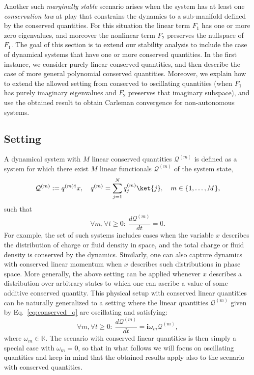 \documentclass[superscriptaddress,onecolumn,nofootinbib,longbibliography,a4paper,accepted=2026-09-29]{quantumarticle}
\theoremstyle{plain}
\theoremstyle{definition}
\numberwithin{thm}{section}
\numberwithin{assumption}{section}
\numberwithin{lemma}{section}
\numberwithin{prop}{section}
\numberwithin{cor}{section}
\numberwithin{definition}{section}
\numberwithin{rmk}{section}
\numberwithin{equation}{section}
\newcommand\Q{ {\mathcal Q} }
\renewcommand{\i}{\ensuremath{\mathbf{i}}}
\begin{document}
Another such \emph{marginally stable} scenario arises when the system has at least one \emph{conservation law} at play that constrains the dynamics to a sub-manifold defined by the conserved quantities. For this situation the linear term $F_1$ has one or more zero eigenvalues, and moreover the nonlinear term $F_2$ preserves the nullspace of $F_1$. The goal of this section is to extend our stability analysis to include the case of dynamical systems that have one or more conserved quantities. In the first instance, we consider purely linear conserved quantities, and then describe the case of more general polynomial conserved quantities. Moreover, we explain how to extend the allowed setting from conserved to oscillating quantities (when $F_1$ has purely imaginary eigenvalues and $F_2$ preserves that imaginary subspace), and use the obtained result to obtain Carleman convergence for non-autonomous systems.


\subsection{Setting}
\label{sec:conservative_setting}

A dynamical system with $M$ linear conserved quantities $\Q^{(m)}$ is defined as a system for which there exist $M$ linear functionals $\Q^{(m)}$ of the system state, 
\begin{equation}
    \label{eq:conserved_q}
    \Q^{(m)} := q^{(m)\dagger} x,\quad q^{(m)} = \sum_{j=1}^N q_j^{(m)} \ket{j}, \quad m\in\{1,\dots,M\},
\end{equation}
such that 
\begin{equation}
    \label{eq:cons_gneral}
    \forall m, \forall t \ge 0:~\frac{d\Q^{(m)}}{dt} = 0.
\end{equation}
For example, the set of such systems includes cases when the variable $x$ describes the distribution of charge or fluid density in space, and the total charge or fluid density is conserved by the dynamics. Similarly, one can also capture dynamics with conserved linear momentum when $x$ describes such distributions in phase space. More generally, the above setting can be applied whenever $x$ describes a distribution over arbitrary states to which one can ascribe a value of some additive conserved quantity. This physical setup with conserved linear quantities can be naturally generalized to a setting where the linear quantities $\Q^{(m)}$ given by Eq.~\eqref{eq:conserved_q} are oscillating and satisfying:
    \begin{equation}
        \label{eq:oscillating}
        \forall m, \forall t \ge 0:~\frac{d\Q^{(m)}}{dt} = \i \omega_m \Q^{(m)},
    \end{equation}
where $\omega_m\in\mathbb{R}$. The scenario with conserved linear quantities is then simply a special case with $\omega_m=0$, so that in what follows we will focus on oscillating quantities and keep in mind that the obtained results apply also to the scenario with conserved quantities.
\end{document}
